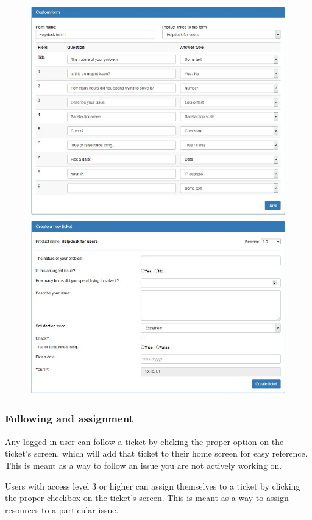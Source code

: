 \documentclass[11pt]{article}
\begin{document}
\begin{figure}[h]
\includegraphics[scale=0.5]{customform.jpg}
\includegraphics[scale=0.5]{customform2.jpg}
\end{figure}

\subsubsection{Following and assignment}
Any logged in user can follow a ticket by clicking the proper option on the ticket's screen, which will add that ticket to their home screen for easy reference. This is meant as a way to follow an issue you are not actively working on.

Users with access level 3 or higher can assign themselves to a ticket by clicking the proper checkbox on the ticket's screen. This is meant as a way to assign resources to a particular issue.
\end{document}
